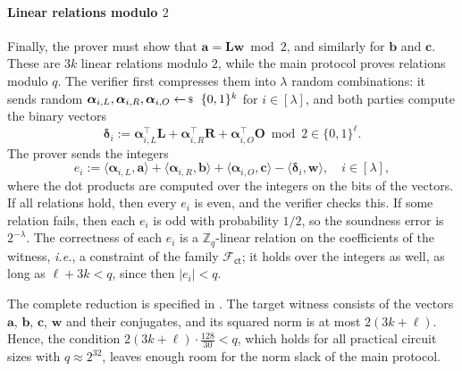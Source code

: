 \documentclass[../../book.tex]{subfiles}
\begin{document}
\paragraph{Linear relations modulo $2$}
Finally, the prover must show that $\mathbf{a} = \mathbf{L}\mathbf{w} \bmod 2$, and similarly for $\mathbf{b}$ and $\mathbf{c}$.
These are $3k$ linear relations modulo $2$, while the main protocol proves relations modulo $q$.
The verifier first compresses them into $\lambda$ random combinations: it sends random $\boldsymbol{\alpha}_{i,L}, \boldsymbol{\alpha}_{i,R}, \boldsymbol{\alpha}_{i,O} \leftarrowS \{0,1\}^k$ for $i \in [\lambda]$, and both parties compute the binary vectors
\begin{equation*}
    \boldsymbol{\delta}_i := \boldsymbol{\alpha}_{i,L}^{\top}\mathbf{L} + \boldsymbol{\alpha}_{i,R}^{\top}\mathbf{R} + \boldsymbol{\alpha}_{i,O}^{\top}\mathbf{O} \bmod 2 \in \{0,1\}^{\ell}.
\end{equation*}
The prover sends the integers
\begin{equation*}
    e_i := \langle \boldsymbol{\alpha}_{i,L}, \mathbf{a} \rangle + \langle \boldsymbol{\alpha}_{i,R}, \mathbf{b} \rangle + \langle \boldsymbol{\alpha}_{i,O}, \mathbf{c} \rangle - \langle \boldsymbol{\delta}_i, \mathbf{w} \rangle, \quad i \in [\lambda],
\end{equation*}
where the dot products are computed over the integers on the bits of the vectors.
If all relations hold, then every $e_i$ is even, and the verifier checks this.
If some relation fails, then each $e_i$ is odd with probability $1/2$, so the soundness error is $2^{-\lambda}$.
The correctness of each $e_i$ is a $\mathbb{Z}_q$-linear relation on the coefficients of the witness, \textit{i.e.}, a constraint of the family $\mathcal{F}_{\mathsf{ct}}$; it holds over the integers as well, as long as $\ell + 3k < q$, since then $|e_i| < q$.

The complete reduction is specified in .
The target witness consists of the vectors $\mathbf{a}$, $\mathbf{b}$, $\mathbf{c}$, $\mathbf{w}$ and their conjugates, and its squared norm is at most $2(3k + \ell)$.
Hence, the condition $2(3k + \ell)\cdot\frac{128}{30} < q$, which holds for all practical circuit sizes with $q \approx 2^{32}$, leaves enough room for the norm slack of the main protocol.
\end{document}

